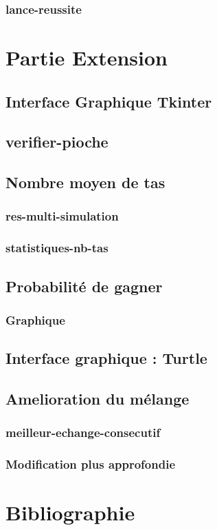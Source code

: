 \documentclass{article}
\begin{document}
        \subsubsection{\ttfamily lance-reussite}


\section{Partie Extension}    
    
    \subsection{Interface Graphique Tkinter}
    \subsection{\ttfamily verifier-pioche}
    \subsection{Nombre moyen de tas}
        \subsubsection{\ttfamily res-multi-simulation}
        \subsubsection{\ttfamily statistiques-nb-tas}
    \subsection{Probabilité de gagner}
        \subsubsection{Graphique}
    \subsection{Interface graphique : Turtle}
    \subsection{Amelioration du mélange}
        \subsubsection{\ttfamily meilleur-echange-consecutif}
        \subsubsection{Modification plus approfondie}
        

\section{Bibliographie}
\end{document}
